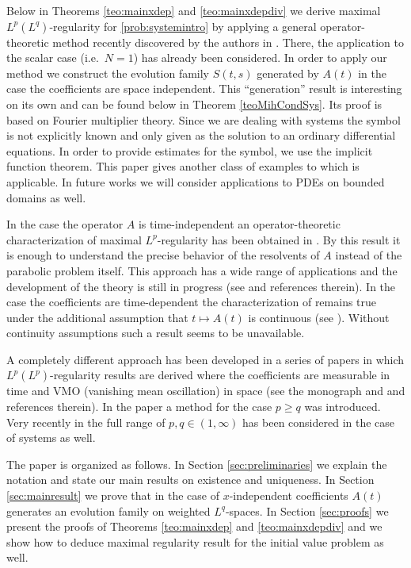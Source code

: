 \documentclass{amsart}
\theoremstyle{plain}
\theoremstyle{remark}
\theoremstyle{plain}
\numberwithin{equation}{section}
\begin{document}
Below in Theorems \ref{teo:mainxdep} and \ref{teo:mainxdepdiv} we derive maximal $L^p(L^q)$-regularity for \eqref{prob:systemintro} by applying a general operator-theoretic method recently discovered by the authors in \cite{GV}. There, the application to the scalar case (i.e.\ $N=1$) has already been considered.
In order to apply our method we construct the evolution family $S(t,s)$ generated by $A(t)$ in the case the coefficients are space independent.
This ``generation'' result is interesting on its own and can be found below in Theorem \ref{teoMihCondSys}.
Its proof is based on Fourier multiplier theory. Since we are dealing with systems the symbol is not explicitly known and only given as the solution to an ordinary differential equations. In order to provide estimates for the symbol, we use the implicit function theorem.
This paper gives another class of examples to which \cite{GV} is applicable. In future works we will consider applications to PDEs on bounded domains as well.

In the case the operator $A$ is time-independent an operator-theoretic characterization of maximal $L^p$-regularity has been obtained in \cite{Weis}. By this result it is enough to understand the precise behavior of the resolvents of $A$ instead of the parabolic problem itself. This approach has a wide range of applications and the development of the theory is still in progress (see \cite{DHP,KW} and references therein). In the case the coefficients are time-dependent the characterization of \cite{Weis} remains true under the additional assumption that $t\mapsto A(t)$ is continuous (see \cite{PS01}). Without continuity assumptions such a result seems to be unavailable.

A completely different approach has been developed in a series of papers in which $L^p(L^p)$-regularity results are derived where the coefficients are measurable in time and VMO (vanishing mean oscillation) in space (see the monograph \cite{krylov} and \cite{DK11} and references therein).
In the paper \cite{Krypq} a method for the case $p \geq q$ was introduced. Very recently in \cite{DKnew} the full range of $p,q\in (1, \infty)$ has been considered in the case of systems as well.

The paper is organized as follows. In Section \ref{sec:preliminaries} we explain the notation and state our main results on existence and uniqueness. In Section \ref{sec:mainresult} we prove that in the case of $x$-independent coefficients $A(t)$ generates an evolution family on weighted $L^q$-spaces. In Section \ref{sec:proofs} we present the proofs of Theorems \ref{teo:mainxdep} and \ref{teo:mainxdepdiv} and we show how to deduce maximal regularity result for the initial value problem as well.
\end{document}
